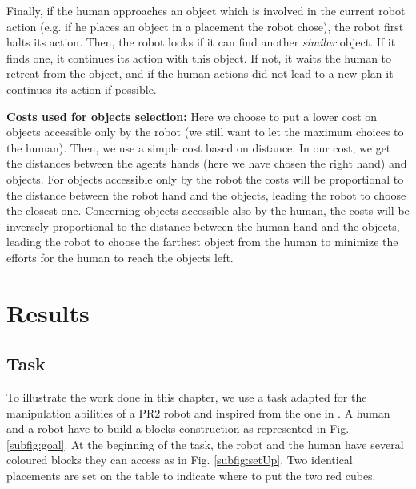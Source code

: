 \documentclass[english,a4paper,11pt,twoside]{StyleThese}
\begin{document}
Finally, if the human approaches an object which is involved in the current robot action (e.g. if he places an object in a placement the robot chose), the robot first halts its action. Then, the robot looks if it can find another \textit{similar} object. If it finds one, it continues its action with this object. If not, it waits the human to retreat from the object, and if the human actions did not lead to a new plan it continues its action if possible.

\textbf{Costs used for objects selection:}
Here we choose to put a lower cost on objects accessible only by the robot (we still want to let the maximum choices to the human). Then, we use a simple cost based on distance. In our cost, we get the distances between the agents hands (here we have chosen the right hand) and objects. For objects accessible only by the robot the costs will be proportional to the distance between the robot hand and the objects, leading the robot to choose the closest one. Concerning objects accessible also by the human, the costs will be inversely proportional to the distance between the human hand and the objects, leading the robot to choose the farthest object from the human to minimize the efforts for the human to reach the objects left. 


\section{Results}

\subsection{Task}

To illustrate the work done in this chapter, we use a task adapted for the manipulation abilities of a PR2 robot and inspired from the one in \cite{clodic2014key}. A human and a robot have to build a blocks construction as represented in Fig. \ref{subfig:goal}. At the beginning of the task, the robot and the human have several coloured blocks they can access as in Fig. \ref{subfig:setUp}. Two identical placements are set on the table to indicate where to put the two red cubes.
\end{document}
